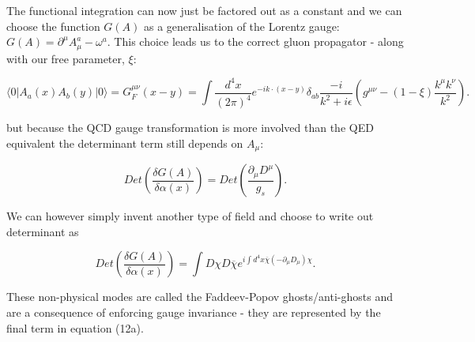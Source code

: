 The functional integration can now just be factored out as a constant and we can choose the
function $G(A)$ as a generalisation of the Lorentz gauge: $G(A)=\partial^\mu A^a_\mu-\omega^a$.
This choice leads us to the correct gluon propagator - along with our free parameter, $\xi$:

\begin{equation}
\langle0|A_a(x)A_b(y)|0\rangle = G_F^{\mu\nu}(x-y) = \int \frac{d^4x}{(2\pi)^4}e^{-ik\cdot(x-y)}
\delta_{ab}\frac{-i}{k^2+i\epsilon}\left(g^{\mu\nu}-(1-\xi)\frac{k^\mu k^\nu}{k^2}\right).
\end{equation}

but because the QCD gauge transformation is more involved than the
QED equivalent the determinant term still depends on $A_\mu$:

\begin{equation}
Det\left(\frac{\delta G(A)}{\delta\alpha(x)}\right) = Det\left(\frac{\partial_\mu D^\mu}{g_s}\right).
\end{equation}

We can however simply invent another type of field and choose to write out determinant as

\begin{equation}
	Det\left(\frac{\delta G(A)}{\delta\alpha(x)}\right) = \int D\chi D\overline{\chi}
	e^{i\int d^4x\overline{\chi}(-\partial_\mu D_\mu)\chi}.
\end{equation}

These non-physical modes are called the Faddeev-Popov ghosts/anti-ghosts and are a consequence
of enforcing gauge invariance - they are represented by the final term in equation (12a).